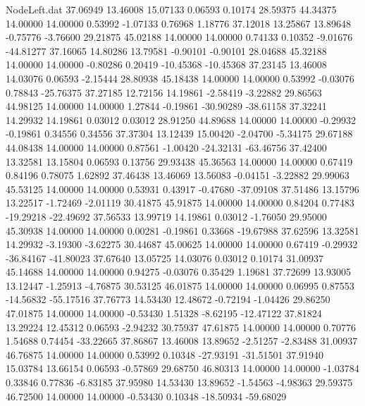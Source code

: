 \begin{filecontents}{NodeLeft.dat}
  37.06949   13.46008   15.07133     0.06593    0.10174   28.59375   44.34375   14.00000   14.00000    0.53992   -1.07133    0.76968    1.18776
  37.12018   13.25867   13.89648    -0.75776   -3.76600   29.21875   45.02188   14.00000   14.00000    0.74133    0.10352   -9.01676  -44.81277
  37.16065   14.80286   13.79581    -0.90101   -0.90101   28.04688   45.32188   14.00000   14.00000   -0.80286    0.20419  -10.45368  -10.45368
  37.23145   13.46008   14.03076     0.06593   -2.15444   28.80938   45.18438   14.00000   14.00000    0.53992   -0.03076    0.78843  -25.76375
  37.27185   12.72156   14.19861    -2.58419   -3.22882   29.86563   44.98125   14.00000   14.00000    1.27844   -0.19861  -30.90289  -38.61158
  37.32241   14.29932   14.19861     0.03012    0.03012   28.91250   44.89688   14.00000   14.00000   -0.29932   -0.19861    0.34556    0.34556
  37.37304   13.12439   15.00420    -2.04700   -5.34175   29.67188   44.08438   14.00000   14.00000    0.87561   -1.00420  -24.32131  -63.46756
  37.42400   13.32581   13.15804     0.06593    0.13756   29.93438   45.36563   14.00000   14.00000    0.67419    0.84196    0.78075    1.62892
  37.46438   13.46069   13.56083    -0.04151   -3.22882   29.99063   45.53125   14.00000   14.00000    0.53931    0.43917   -0.47680  -37.09108
  37.51486   13.15796   13.22517    -1.72469   -2.01119   30.41875   45.91875   14.00000   14.00000    0.84204    0.77483  -19.29218  -22.49692
  37.56533   13.99719   14.19861     0.03012   -1.76050   29.95000   45.30938   14.00000   14.00000    0.00281   -0.19861    0.33668  -19.67988
  37.62596   13.32581   14.29932    -3.19300   -3.62275   30.44687   45.00625   14.00000   14.00000    0.67419   -0.29932  -36.84167  -41.80023
  37.67640   13.05725   14.03076     0.03012    0.10174   31.00937   45.14688   14.00000   14.00000    0.94275   -0.03076    0.35429    1.19681
  37.72699   13.93005   13.12447    -1.25913   -4.76875   30.53125   46.01875   14.00000   14.00000    0.06995    0.87553  -14.56832  -55.17516
  37.76773   14.53430   12.48672    -0.72194   -1.04426   29.86250   47.01875   14.00000   14.00000   -0.53430    1.51328   -8.62195  -12.47122
  37.81824   13.29224   12.45312     0.06593   -2.94232   30.75937   47.61875   14.00000   14.00000    0.70776    1.54688    0.74454  -33.22665
  37.86867   13.46008   13.89652    -2.51257   -2.83488   31.00937   46.76875   14.00000   14.00000    0.53992    0.10348  -27.93191  -31.51501
  37.91940   15.03784   13.66154     0.06593   -0.57869   29.68750   46.80313   14.00000   14.00000   -1.03784    0.33846    0.77836   -6.83185
  37.95980   14.53430   13.89652    -1.54563   -4.98363   29.59375   46.72500   14.00000   14.00000   -0.53430    0.10348  -18.50934  -59.68029

\end{filecontents}
